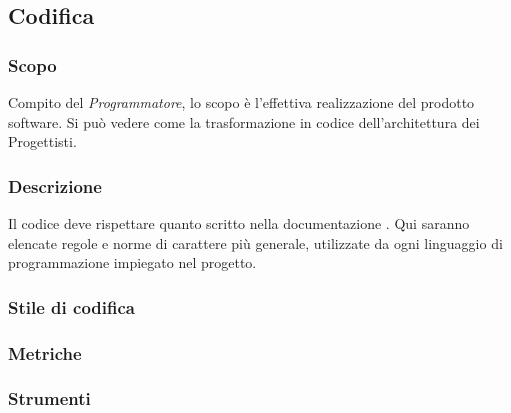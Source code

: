 \subsection{Codifica}
\subsubsection{Scopo}
Compito del \textit{Programmatore}, lo scopo è l’effettiva realizzazione del prodotto software. Si può vedere come la trasformazione in codice dell’architettura dei Progettisti.

\subsubsection{Descrizione}
Il codice deve rispettare quanto scritto nella documentazione \PdQ. Qui saranno elencate regole e norme di carattere più generale, utilizzate da ogni linguaggio di programmazione impiegato nel progetto.

\subsubsection{Stile di codifica}
\subsubsection{Metriche}
\subsubsection{Strumenti}
